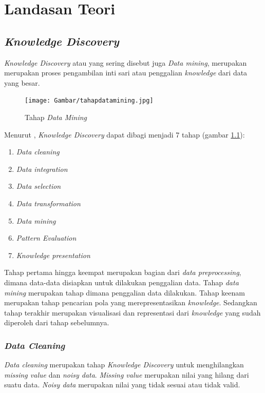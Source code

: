 \chapter{Landasan Teori}
\label{chap:definition}

\section{\textsl{Knowledge Discovery}}

\textsl{Knowledge Discovery} atau yang sering disebut juga \textsl{Data mining}, merupakan merupakan proses pengambilan inti sari atau penggalian \textsl{knowledge} dari data yang besar. 


\begin{figure}[H]
\centering
\texttt{[image: Gambar/tahapdatamining.jpg]}
\caption[Tahap \textsl{Data Mining}]{Tahap \textsl{Data Mining}\cite{DM}} 
\label{fig:tahapDataMining}
\end{figure}

Menurut \cite{DM}, \textsl{Knowledge Discovery} dapat dibagi menjadi 7 tahap (gambar \ref{fig:tahapDataMining}):
\begin{enumerate}
	\item \textsl{Data cleaning}
	\item \textsl{Data integration}
	\item \textsl{Data selection}
	\item \textsl{Data transformation}
	\item \textsl {Data mining}
	\item \textsl{Pattern Evaluation}
	\item \textsl{Knowledge presentation}
\end{enumerate}

Tahap pertama hingga keempat merupakan bagian dari \textsl{data preprocessing}, dimana data-data disiapkan untuk dilakukan penggalian data. Tahap \textsl{data mining} merupakan tahap dimana penggalian data dilakukan. Tahap keenam merupakan tahap pencarian pola yang merepresentasikan \textsl{knowledge}. Sedangkan tahap terakhir merupakan visualisasi dan representasi dari \textsl{knowledge} yang sudah diperoleh dari tahap sebelumnya.

\subsection{\textsl{Data Cleaning}}
\textsl{Data cleaning} merupakan tahap \textsl{Knowledge Discovery} untuk menghilangkan \textsl{missing value} dan \textsl{noisy data}. \textsl{Missing value} merupakan nilai yang hilang dari suatu data. \textsl{Noisy data} merupakan nilai yang tidak sesuai atau tidak valid.

